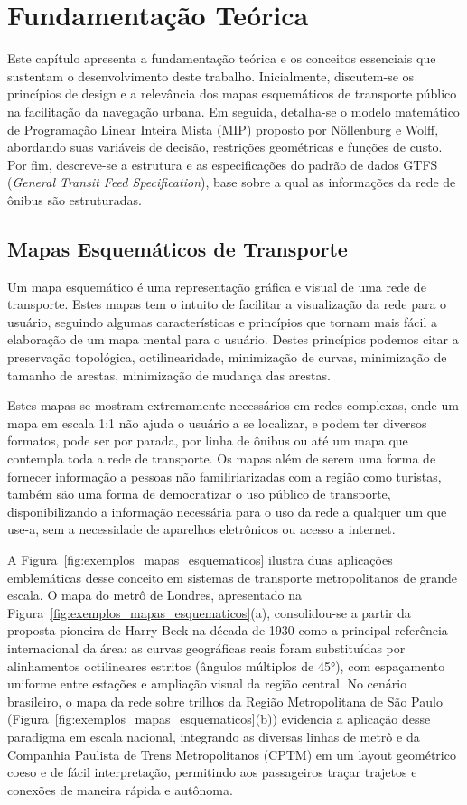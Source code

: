 \documentclass[cic,tc]{infufrgs}
\begin{document}
\chapter{Fundamentação Teórica}
\label{cap:fundamentacao}

Este capítulo apresenta a fundamentação teórica e os conceitos essenciais que sustentam o desenvolvimento deste trabalho. Inicialmente, discutem-se os princípios de design e a relevância dos mapas esquemáticos de transporte público na facilitação da navegação urbana. Em seguida, detalha-se o modelo matemático de Programação Linear Inteira Mista (MIP) proposto por Nöllenburg e Wolff, abordando suas variáveis de decisão, restrições geométricas e funções de custo. Por fim, descreve-se a estrutura e as especificações do padrão de dados GTFS (\textit{General Transit Feed Specification}), base sobre a qual as informações da rede de ônibus são estruturadas.

\section{Mapas Esquemáticos de Transporte}

Um mapa esquemático é uma representação gráfica e visual de uma rede de transporte. Estes mapas tem o intuito de facilitar a visualização da rede para o usuário, seguindo algumas características e princípios que tornam mais fácil a elaboração de um mapa mental para o usuário. Destes princípios podemos citar a preservação topológica, octilinearidade, minimização de curvas, minimização de tamanho de arestas, minimização de mudança das arestas.

Estes mapas se mostram extremamente necessários em redes complexas, onde um mapa em escala 1:1 não ajuda o usuário a se localizar, e podem ter diversos formatos, pode ser por parada, por linha de ônibus ou até um mapa que contempla toda a rede de transporte. Os mapas além de serem uma forma de fornecer informação a pessoas não familiriarizadas com a região como turistas, também são uma forma de democratizar o uso público de transporte, disponibilizando a informação necessária para o uso da rede a qualquer um que use-a, sem a necessidade de aparelhos eletrônicos ou acesso a internet.

A Figura~\ref{fig:exemplos_mapas_esquematicos} ilustra duas aplicações emblemáticas desse conceito em sistemas de transporte metropolitanos de grande escala. O mapa do metrô de Londres, apresentado na Figura~\ref{fig:exemplos_mapas_esquematicos}(a), consolidou-se a partir da proposta pioneira de Harry Beck na década de 1930 como a principal referência internacional da área: as curvas geográficas reais foram substituídas por alinhamentos octilineares estritos (ângulos múltiplos de 45°), com espaçamento uniforme entre estações e ampliação visual da região central. No cenário brasileiro, o mapa da rede sobre trilhos da Região Metropolitana de São Paulo (Figura~\ref{fig:exemplos_mapas_esquematicos}(b)) evidencia a aplicação desse paradigma em escala nacional, integrando as diversas linhas de metrô e da Companhia Paulista de Trens Metropolitanos (CPTM) em um layout geométrico coeso e de fácil interpretação, permitindo aos passageiros traçar trajetos e conexões de maneira rápida e autônoma.
\end{document}
